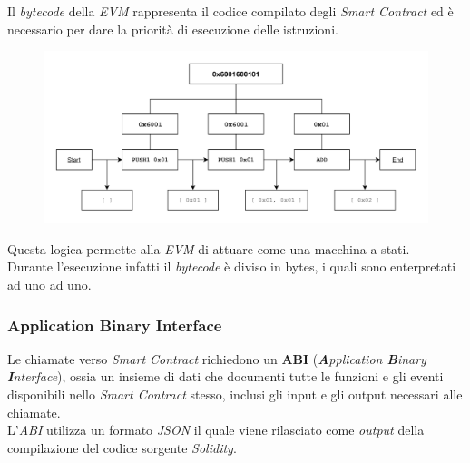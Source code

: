 \documentclass[11pt]{thesistemp}
\begin{document}
Il \textit{bytecode} della \textit{EVM} rappresenta il codice compilato degli \textit{Smart Contract} ed è necessario per dare la priorità di esecuzione delle istruzioni.\\
\begin{figure}[h]\hfill
    \centering
    \includegraphics[width=\textwidth]{bytecode.png}
    \label{fig:bytecode}
\end{figure}
\linebreak
Questa logica permette alla \textit{EVM} di attuare come una macchina a stati.\\
Durante l'esecuzione infatti il \textit{bytecode} è diviso in bytes, i quali sono enterpretati ad uno ad uno.\\

\subsubsection{Application Binary Interface}

Le chiamate verso \textit{Smart Contract} richiedono un \textbf{ABI} (\textit{\textbf{A}pplication \textbf{B}inary \textbf{I}nterface}), ossia un insieme di dati che documenti tutte le funzioni e gli eventi disponibili nello \textit{Smart Contract} stesso, inclusi gli input e gli output necessari alle chiamate.\\
L'\textit{ABI} utilizza un formato \textit{JSON} il quale viene rilasciato come \textit{output} della compilazione del codice sorgente \textit{Solidity}.
\end{document}
